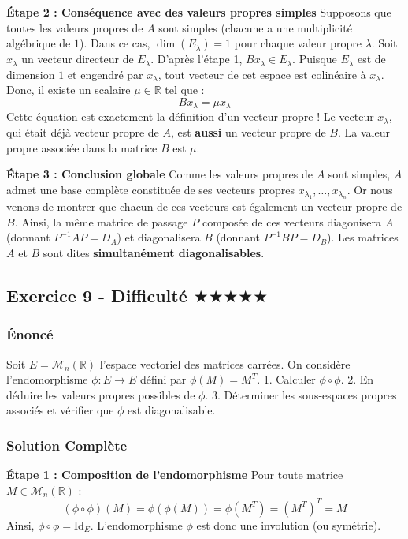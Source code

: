 \documentclass[11pt,a4paper]{article}
\begin{document}
\textbf{Étape 2 : Conséquence avec des valeurs propres simples}
Supposons que toutes les valeurs propres de $A$ sont simples (chacune a une multiplicité algébrique de $1$).
Dans ce cas, $\dim(E_\lambda) = 1$ pour chaque valeur propre $\lambda$.
Soit $x_\lambda$ un vecteur directeur de $E_\lambda$.
D'après l'étape 1, $B x_\lambda \in E_\lambda$.
Puisque $E_\lambda$ est de dimension $1$ et engendré par $x_\lambda$, tout vecteur de cet espace est colinéaire à $x_\lambda$.
Donc, il existe un scalaire $\mu \in \mathbb{R}$ tel que :
$$B x_\lambda = \mu x_\lambda$$
Cette équation est exactement la définition d'un vecteur propre !
Le vecteur $x_\lambda$, qui était déjà vecteur propre de $A$, est \textbf{aussi} un vecteur propre de $B$.
La valeur propre associée dans la matrice $B$ est $\mu$.

\textbf{Étape 3 : Conclusion globale}
Comme les valeurs propres de $A$ sont simples, $A$ admet une base complète constituée de ses vecteurs propres $x_{\lambda_1}, \dots, x_{\lambda_n}$.
Or nous venons de montrer que chacun de ces vecteurs est également un vecteur propre de $B$.
Ainsi, la même matrice de passage $P$ composée de ces vecteurs diagonisera $A$ (donnant $P^{-1}AP = D_A$) et diagonalisera $B$ (donnant $P^{-1}BP = D_B$).
Les matrices $A$ et $B$ sont dites \textbf{simultanément diagonalisables}.


\subsection*{Exercice 9 - Difficulté \quad $\bigstar$$\bigstar$$\bigstar$$\bigstar$$\bigstar$}

\subsubsection*{Énoncé}
Soit $E = \mathcal{M}_n(\mathbb{R})$ l'espace vectoriel des matrices carrées.
On considère l'endomorphisme $\phi : E \to E$ défini par $\phi(M) = M^T$.
1. Calculer $\phi \circ \phi$.
2. En déduire les valeurs propres possibles de $\phi$.
3. Déterminer les sous-espaces propres associés et vérifier que $\phi$ est diagonalisable.

\subsubsection*{Solution Complète}

\textbf{Étape 1 : Composition de l'endomorphisme}
Pour toute matrice $M \in \mathcal{M}_n(\mathbb{R})$ :
$$(\phi \circ \phi)(M) = \phi(\phi(M)) = \phi(M^T) = (M^T)^T = M$$
Ainsi, $\phi \circ \phi = \text{Id}_E$.
L'endomorphisme $\phi$ est donc une involution (ou symétrie).
\end{document}
